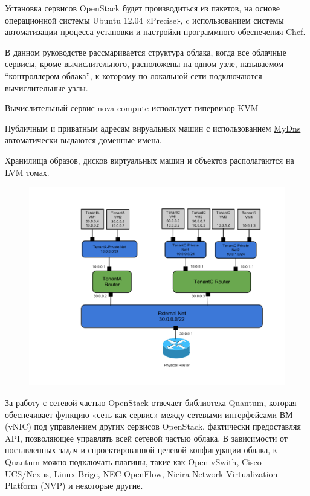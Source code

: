 \documentclass[letterpaper,10pt,russian]{sphinxmanual}
\begin{document}
Установка сервисов OpenStack будет производиться из пакетов, на основе операционной системы Ubuntu 12.04 «Precise», c использованием системы автоматизации процесса установки и настройки программного обеспечения Chef.

В данном руководстве рассмаривается структура облака, когда все облачные сервисы, кроме вычислительного, расположены на одном узле, называемом ``контроллером облака'', к которому по локальной сети подключаются вычислительные узлы.

Вычислительный сервис nova-compute использует гипервизор \href{http://www.linux-kvm.org/page/Main\_Page}{KVM}

Публичным и приватным адресам вируальных машин с использованием \href{http://mydns.bboy.net/}{MyDns} автоматически выдаются доменные имена.

Хранилища образов, дисков виртуальных машин и объектов располагаются на LVM томах.
\begin{figure}[htbp]
\centering

\includegraphics{quantum.png}
\end{figure}

За работу с сетевой частью OpenStack отвечает библиотека Quantum, которая обеспечивает функцию «сеть как сервис» между сетевыми интерфейсами ВМ (vNIC) под управлением других сервисов OpenStack, фактически предоставляя API, позволяющее управлять всей сетевой частью облака. В зависимости от поставленных задач и спроектированной целевой конфигурации облака, к Quantum можно подключать плагины, такие как Open vSwith, Cisco UCS/Nexus, Linux Brige, NEC OpenFlow, Nicira Network Virtualization Platform (NVP) и некоторые другие.
\end{document}
